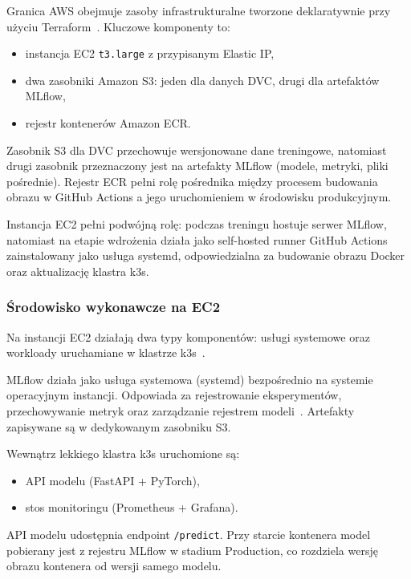 Granica AWS obejmuje zasoby infrastrukturalne tworzone deklaratywnie przy użyciu Terraform~\cite{hashicorp_terraform}. Kluczowe komponenty to:

\begin{itemize}
    \item instancja EC2 \texttt{t3.large} z przypisanym Elastic IP,
    \item dwa zasobniki Amazon S3: jeden dla danych DVC, drugi dla artefaktów MLflow,
    \item rejestr kontenerów Amazon ECR.
\end{itemize}

Zasobnik S3 dla DVC przechowuje wersjonowane dane treningowe, natomiast drugi zasobnik przeznaczony jest na artefakty MLflow (modele, metryki, pliki pośrednie). Rejestr ECR pełni rolę pośrednika między procesem budowania obrazu w GitHub Actions a jego uruchomieniem w środowisku produkcyjnym.

Instancja EC2 pełni podwójną rolę: podczas treningu hostuje serwer MLflow, natomiast na etapie wdrożenia działa jako self-hosted runner GitHub Actions zainstalowany jako usługa systemd, odpowiedzialna za budowanie obrazu Docker oraz aktualizację klastra k3s.

\subsubsection{Środowisko wykonawcze na EC2}

Na instancji EC2 działają dwa typy komponentów: usługi systemowe oraz workloady uruchamiane w klastrze k3s~\cite{k3s_docs}.

MLflow działa jako usługa systemowa (systemd) bezpośrednio na systemie operacyjnym instancji. Odpowiada za rejestrowanie eksperymentów, przechowywanie metryk oraz zarządzanie rejestrem modeli~\cite{mlflow_model_registry}. Artefakty zapisywane są w dedykowanym zasobniku S3.

Wewnątrz lekkiego klastra k3s uruchomione są:

\begin{itemize}
    \item API modelu (FastAPI + PyTorch),
    \item stos monitoringu (Prometheus + Grafana).
\end{itemize}

API modelu udostępnia endpoint \texttt{/predict}. Przy starcie kontenera model pobierany jest z rejestru MLflow w stadium Production, co rozdziela wersję obrazu kontenera od wersji samego modelu.

